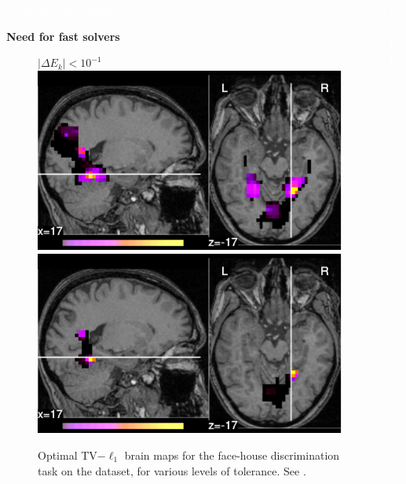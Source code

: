 \documentclass[french]{STIC_poster}
\begin{document}
\begin{frame}[t]
\begin{columns}[t]
\begin{column}{.48\linewidth}
\begin{abox}{\textbf{\textcolor{white}{Problem statement}}}
\begin{nbox}[\textwidth]{\textbf{Need for fast solvers}}
\begin{itemize}
\begin{figure}
{{{                                          $|\Delta E_k| < 10^{-1}$}}\hspace*{.32\linewidth}}\hfill%
                                    \includegraphics[width=.32\linewidth]{maps/face_vs_house_tol_0_001.pdf}%
                                    \hfill%
                                    \includegraphics[width=.32\linewidth]{maps/face_vs_house_tol_1e-05.pdf}%
                                    \caption{Optimal TV$-\ell_1$ brain maps for the face-house discrimination task on
                                      the \textcolor{cyan}{\cite{haxby2001}} dataset, for various levels of tolerance. See \textcolor{cyan}{\cite{dohmatob2014benchmarking}}.}%
                                    \label{fig:maps_tolerance}
                                  \end{figure}
                                  \end{itemize}
                                \end{nbox}
				\end{abox}
			\end{column}
			\hfill
			\begin{column}{.48\linewidth}
			  \begin{abox}{\textbf{\textcolor{white}{Results}}}

\end{abox}
\end{column}
\end{columns}
\end{frame}
\end{document}
